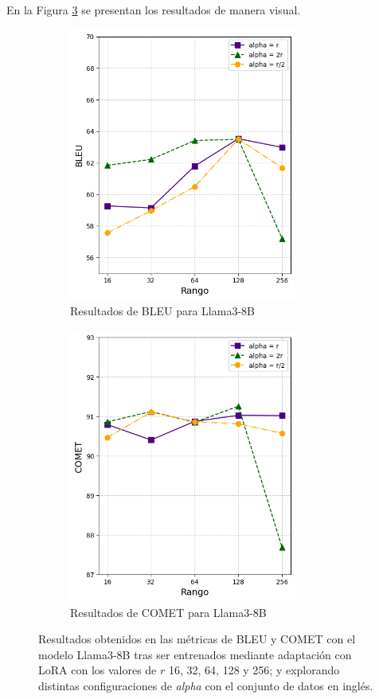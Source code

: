 \documentclass[11pt,spanish,listoffigures,listoftables]{tfgetsinf}
\begin{document}
En la Figura \ref{fig:graficasLlama inglés} se presentan los resultados de manera visual.

\begin{figure}
\begin{subfigure}{0.5\textwidth}
\includegraphics[width=0.9\linewidth, height=9cm]{images/llama_BLEU_en} 
\caption{Resultados de BLEU para Llama3-8B}
\label{fig:subim1}
\end{subfigure}
\begin{subfigure}{0.5\textwidth}
\includegraphics[width=0.9\linewidth, height=9cm]{images/llama_COMET_en}
\caption{Resultados de COMET para Llama3-8B}
\label{fig:subim2}
\end{subfigure}

\caption{Resultados obtenidos en las métricas de BLEU y COMET con el modelo Llama3-8B tras ser entrenados mediante adaptación con LoRA con los valores de $r$ 16, 32, 64, 128 y 256;  y explorando distintas configuraciones de \textit{alpha} con el conjunto de datos en inglés.}
\label{fig:graficasLlama inglés}
\end{figure}
\end{document}
